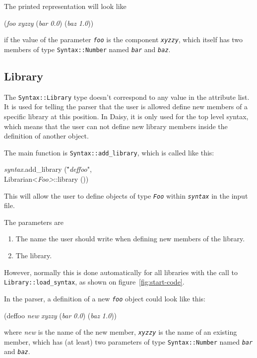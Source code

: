 \documentclass{article}
\newcommand{\code}[1]{\texttt{#1}}
\begin{document}
The printed representation will look like
\begin{center}
  \begin{tt}
    (\textit{foo} \textit{xyzzy} 
      (\textit{bar} \textit{0.0}) (\textit{baz} \textit{1.0}))
  \end{tt}
\end{center}
if the value of the parameter \texttt{\textit{foo}} is the component
\texttt{\textit{xyzzy}}, which itself has two members of type
\code{Syntax::Number} named \texttt{\textit{bar}} and
\texttt{\textit{baz}}.

\subsection{Library}

The \code{Syntax::Library} type doesn't correspond to any value in the
attribute list.  It is used for telling the parser that the user is
allowed define new members of a specific library at this position.  In
Daisy, it is only used for the top level syntax, which means that the
user can not define new library members inside the definition of
another object.

The main function is \code{Syntax::add\_library}, which is called like
this:
\begin{center}
  \begin{tt}
    \begin{tabbing}
      \textit{syntax}.add\_library (\="\textit{deffoo}",\\
                                   \>Librarian<\textit{Foo>}::library ())
    \end{tabbing}
  \end{tt}
\end{center}
This will allow the user to define objects of type
\texttt{\textit{Foo}} within \texttt{\textit{syntax}} in the input
file.  

The parameters are
\begin{enumerate}
\item The name the user should write when defining new members of the
  library.
\item The library.
\end{enumerate}

However, normally this is done automatically for all libraries
with the call to \texttt{Library::load\_syntax}, as shown on
figure~\ref{fig:start-code}. 

In the parser, a definition of a new \texttt{\textit{foo}} object
could look like this:
\begin{center}
  \begin{tt}
    (deffoo \textit{new} \textit{xyzzy} 
      (\textit{bar} \textit{0.0}) (\textit{baz} \textit{1.0}))
  \end{tt}
\end{center}
where \textit{new} is the name of the new member,
\texttt{\textit{xyzzy}} is the name of an existing member, which has
(at least) two parameters of type \code{Syntax::Number} named
\texttt{\textit{bar}} and \texttt{\textit{baz}}.
\end{document}
